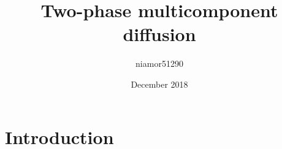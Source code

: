 \documentclass{article}
\title{Two-phase multicomponent diffusion}
\author{niamor51290 }
\date{December 2018}
\begin{document}
\maketitle

\section{Introduction}
\end{document}
